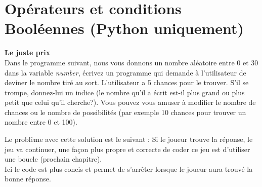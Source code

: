 \section{Opérateurs et conditions Booléennes (Python uniquement)}

\begin{Exercice}[20 minutes] \textbf{Le juste prix \optionnel }\\
  Dans le programme suivant, nous vous donnons un nombre aléatoire entre 0 et 30 dans la variable \textit{number}, écrivez un programme qui demande à l'utilisateur de deviner le nombre tiré au sort. L'utilisateur a 5 chances pour le trouver. S'il se trompe, donnez-lui un indice (le nombre qu'il a écrit est-il plus grand ou plus petit que celui qu'il cherche?). Vous pouvez vous amuser à modifier le nombre de chances ou le nombre de possibilités (par exemple 10 chances pour trouver un nombre entre 0 et 100).   \\
  
  

  \begin{comment}
    \begin{conseil}
      	Vous pouvez ajouter une boucle \lstinline{for i in range(5)} pour simplifier le code!
    \end{conseil}
  \end{comment}
    \begin{solution}

   
   
   Le problème avec cette solution est le suivant : Si le joueur trouve la réponse, le jeu va continuer, une façon plus propre et correcte de coder ce jeu est d'utiliser une boucle (prochain chapitre). \\
   
   
   
  	Ici le code est plus concis et permet de s'arrêter lorsque le joueur aura trouvé la bonne réponse.\\
           
    \end{solution}   
\end{Exercice}


